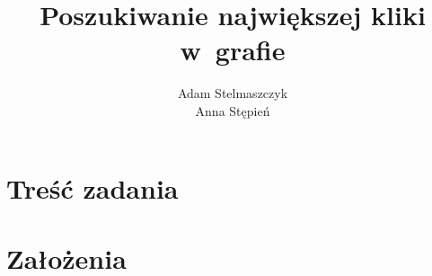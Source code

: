 \documentclass[12pt, a4paper]{article}
\title{\textbf{Poszukiwanie największej kliki w~grafie}}
\author{Adam Stelmaszczyk\\
		Anna Stępień\\}
\date{}
\begin{document}
\maketitle

\section{Treść zadania}
\section{Założenia}
\end{document}
